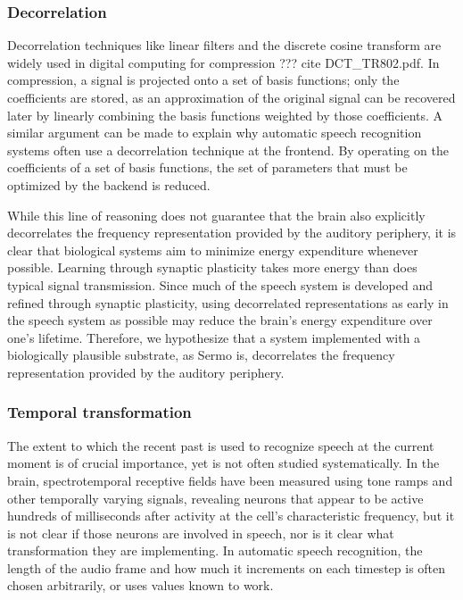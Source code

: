 \subsubsection{Decorrelation}

Decorrelation techniques like
linear filters and the discrete cosine transform
are widely used in digital computing
for compression ??? cite DCT_TR802.pdf.
In compression, a signal is projected
onto a set of basis functions;
only the coefficients are stored,
as an approximation of the original signal
can be recovered later by linearly combining
the basis functions weighted by those coefficients.
A similar argument can be made
to explain why automatic speech recognition systems
often use a decorrelation technique
at the frontend.
By operating on the coefficients of a set
of basis functions,
the set of parameters that must be optimized
by the backend is reduced.

While this line of reasoning
does not guarantee that
the brain also explicitly decorrelates
the frequency representation
provided by the auditory periphery,
it is clear that biological systems
aim to minimize energy expenditure whenever possible.
Learning through synaptic plasticity
takes more energy than does
typical signal transmission.
Since much of the speech system
is developed and refined
through synaptic plasticity,
using decorrelated representations
as early in the speech system as possible
may reduce the brain's energy expenditure
over one's lifetime.
Therefore, we hypothesize
that a system implemented
with a biologically plausible substrate,
as Sermo is,
decorrelates the frequency representation
provided by the auditory periphery.

\subsubsection{Temporal transformation}

The extent to which the recent past
is used to recognize speech
at the current moment
is of crucial importance,
yet is not often studied systematically.
In the brain, spectrotemporal receptive fields
have been measured using
tone ramps and other temporally varying signals,
revealing neurons that appear to be active
hundreds of milliseconds
after activity at
the cell's characteristic frequency,
but it is not clear if those
neurons are involved in speech,
nor is it clear what transformation they are implementing.
In automatic speech recognition,
the length of the audio frame
and how much it increments on each timestep
is often chosen arbitrarily,
or uses values known to work.

